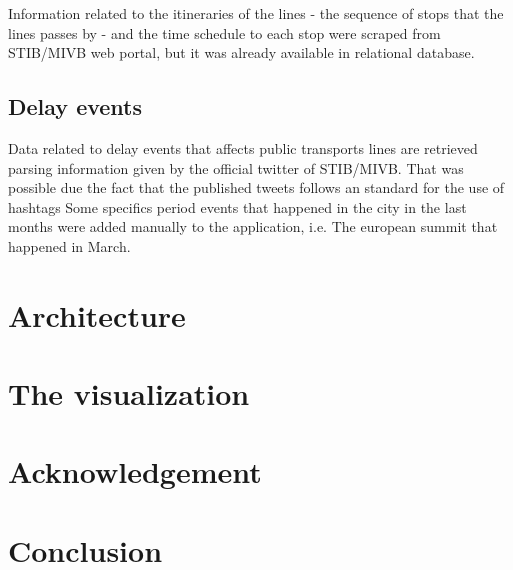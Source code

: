 \documentclass[12pt]{article}%
\begin{document}
Information related to the itineraries of the lines - the sequence of stops that the lines passes by - and the time schedule to each stop were scraped from STIB/MIVB web portal, but it was already available in relational database.

\subsection{Delay events}
Data related to delay events that affects public transports lines are retrieved parsing information given by the official twitter of STIB/MIVB. %
That was possible due the fact that the published tweets follows an standard for the use of hashtags
Some specifics period events that happened in the city in the last months were added manually to the application, i.e. The european summit that happened in March.                       
                       
\section{Architecture}
 
\section{The visualization}

\section{Acknowledgement}

\section{Conclusion}
\end{document}
